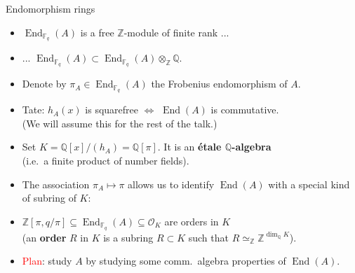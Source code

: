 \documentclass[usenames,dvipsnames,handout]{beamer}
\def\Q{\mathbb{Q}}
\def\Z{\mathbb{Z}}
\def\F{\mathbb{F}}
\DeclareMathOperator{\End}{End}
\DeclareMathOperator{\Jac}{Jac}
\newcommand{\cO}{{\mathcal O}}
\newcommand{\red}[1]{\textcolor{red}{#1}}
\begin{document}
\begin{frame}{ Endomorphism rings }
	\begin{itemize}
    \item $\End_{\F_q}(A)$ is a free $\Z$-module of finite rank ... 
\pause 
    \item ... $\End_{\F_q}(A) \subset \End_{\F_q}(A)\otimes_\Z\Q$.
\pause 
    \item Denote by $\pi_A\in \End_{\F_q}(A)$ the Frobenius endomorphism of $A$.
\pause 
    \item Tate: $h_A(x)$ is squarefree $\iff$ $\End(A)$ is commutative.\\
    (We will assume this for the rest of the talk.)
\pause 
    \item Set $K=\Q[x]/(h_A) = \Q[\pi]$. It is an {\bf \'etale $\Q$-algebra}\\
    (i.e.~a finite product of number fields).
\pause 
    \item The association $\pi_A \mapsto \pi$ allows us to identify $\End(A)$ with a special kind of subring of $K$:
\pause 
    \item $\Z[\pi,q/\pi] \subseteq \End_{\F_q}(A) \subseteq \cO_K$ are orders in $K$\\
    (an {\bf order} $R$ in $K$ is a subring $R\subset K$ such that $R\simeq_\Z \Z^{\dim_\Q K}$).
\pause 
    \item 
    \red{Plan}: study $A$ by studying some comm.~algebra properties of $\End(A)$.
	\end{itemize}
\end{frame}

\end{document}
